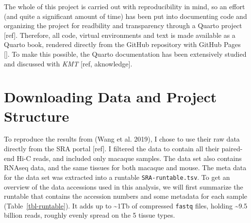 \documentclass[
  a4paper,
]{scrbook}
\let\oldemph\emph
\renewcommand\emph[1]{\oldemph{\color{gray}#1}}
\begin{document}
The whole of this project is carried out with reproducibility in mind,
so an effort (and quite a significant amount of time) has been put into
documenting code and organizing the project for readbility and
transparency through a Quarto project {[}ref{]}. Therefore, all code,
virtual environments and text is made available as a Quarto book,
rendered directly from the GitHub repository with GitHub Pages {[}{]}.
To make this possible, the Quarto documentation has been extensively
studied and discussed with \emph{KMT} {[}ref, aknowledge{]}.

\section{Downloading Data and Project
Structure}\label{downloading-data-and-project-structure}

To reproduce the results from (Wang et al. 2019), I chose to use their
raw data directly from the SRA portal {[}ref{]}. I filtered the data to
contain all their paired-end Hi-C reads, and included only macaque
samples. The data set also contains RNAseq data, and the same tissues
for both macaque and mouse. The meta data for the data set was extracted
into a runtable \texttt{SRA-runtable.tsv}. To get an overview of the
data accessions used in this analysis, we will first summarize the
runtable that contains the accession numbers and some metadata for each
sample (Table~\ref{tbl-runtable}). It adds up to \textasciitilde1Tb of
compressed \texttt{fastq} files, holding \textasciitilde9.5 billion
reads, roughly evenly spread on the 5 tissue types.
\end{document}
